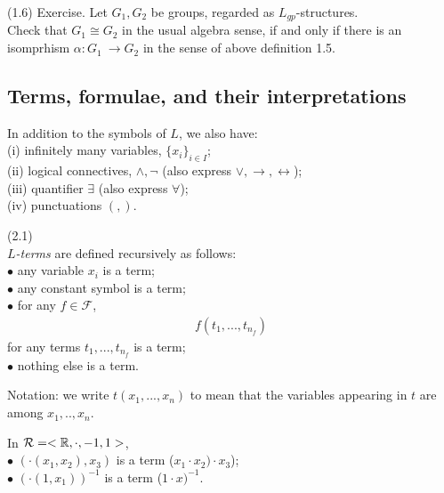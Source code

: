 \documentclass[a4paper]{article}
\begin{document}
(1.6) Exercise. Let $G_1,G_2$ be groups, regarded as $L_{gp}$-structures.\\
Check that $G_1 \cong G_2$ in the usual algebra sense, if and only if there is an isomprhism $\alpha:G_1\ \to G_2$ in the sense of above definition 1.5.

\subsection{Terms, formulae, and their interpretations}
In addition to the symbols of $L$, we also have:\\
(i) infinitely many variables, $\{x_i\}_{i \in I}$;\\
(ii) logical connectives, $\wedge,\neg$ (also express $\vee, \to, \leftrightarrow$);\\
(iii) quantifier $\exists$ (also express $\forall$);\\
(iv) punctuations $(,)$.

\begin{defi} (2.1) \\
\emph{$L$-terms} are defined recursively as follows:\\
$\bullet$ any variable $x_i$ is a term;\\
$\bullet$ any constant symbol is a term;\\
$\bullet$ for any $f \in \mathcal{F}$, 
\begin{equation*}
\begin{aligned}
f(t_1,...,t_{n_f})
\end{aligned}
\end{equation*}
for any terms $t_1,...,t_{n_f}$ is a term;\\
$\bullet$ nothing else is a term.
\end{defi}

Notation: we write $t(x_1,...,x_n)$ to mean that the variables appearing in $t$ are among $x_1,..,x_n$.

\begin{eg}
In $\mathcal{R} = <\mathbb{R},\cdot,-1,1>$,\\
$\bullet$ $(\cdot (x_1,x_2),x_3)$ is a term ($x_1 \cdot x_2) \cdot x_3$);\\
$\bullet$ $(\cdot (1,x_1))^{-1}$ is a term ($1 \cdot x)^{-1}$.
\end{eg}
\end{document}
